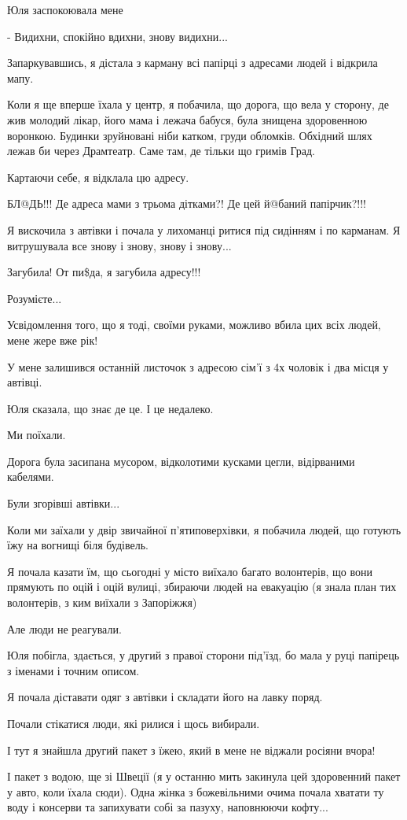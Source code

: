 Юля заспокоювала мене

- Видихни,  спокійно вдихни, знову видихни...

Запаркувавшись, я дістала з карману всі папірці з адресами людей і відкрила
мапу.

Коли я ще вперше їхала у центр, я побачила, що дорога, що вела у сторону, де
жив молодий лікар, його мама і лежача бабуся, була знищена здоровенною
воронкою. Будинки зруйновані ніби катком,  груди обломків.  Обхідний шлях лежав
би через Драмтеатр. Саме там, де тільки що гримів Град.

Картаючи себе, я відклала цю адресу.

БЛ@ДЬ!!! Де адреса мами з трьома дітками?! Де цей й@баний папірчик?!!!

Я вискочила з автівки і почала у лихоманці ритися під сидінням і по карманам. Я
витрушувала все знову і знову, знову і знову... 

Загубила! От пи\$да, я загубила адресу!!!

Розумієте... 

Усвідомлення того, що я тоді, своїми руками, можливо вбила цих всіх людей, мене
жере вже рік!

У мене залишився останній листочок з адресою сім'ї з 4х чоловік і два місця у
автівці. 

Юля сказала, що знає де це. І це недалеко.

Ми поїхали.

Дорога була засипана мусором, відколотими кусками цегли, відірваними кабелями. 

Були згорівші автівки...

Коли ми заїхали у двір звичайної п'ятиповерхівки, я побачила людей, що готують
їжу на вогнищі біля будівель.

Я почала казати їм, що сьогодні у місто виїхало багато волонтерів, що вони
прямують по оцій і оцій вулиці, збираючи людей на евакуацію (я знала план тих
волонтерів, з ким виїхали з Запоріжжя)

Але люди не реагували.

Юля побігла, здається, у другий з правої сторони під'їзд, бо мала у руці
папірець з іменами і точним описом.

Я почала діставати одяг з автівки і складати його на лавку поряд. 

Почали стікатися люди, які рилися і щось вибирали.

І тут я знайшла другий пакет з їжею,  який в мене не віджали росіяни вчора! 

І пакет з водою, ще зі Швеції (я у останню мить закинула цей здоровенний пакет
у авто, коли їхала сюди). Одна жінка з божевільними очима почала хватати ту
воду і консерви та запихувати собі за пазуху, наповнюючи кофту...

